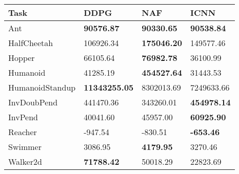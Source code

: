 \begin{tabular}[c]{@{}llll@{}}
Task & DDPG & NAF & ICNN \\ \hline
Ant & \textbf{90576.87} & \textbf{90330.65} & \textbf{90538.84} \\
HalfCheetah & 106926.34 & \textbf{175046.20} & 149577.46 \\
Hopper & 66105.64 & \textbf{76982.78} & 36100.99 \\
Humanoid & 41285.19 & \textbf{454527.64} & 31443.53 \\
HumanoidStandup & \textbf{11343255.05} & 8302013.69 & 7249633.66 \\
InvDoubPend & 441470.36 & 343260.01 & \textbf{454978.14} \\
InvPend & 40041.60 & 45957.00 & \textbf{60925.90} \\
Reacher & -947.54 & -830.51 & \textbf{-653.46} \\
Swimmer & 3086.95 & \textbf{4179.95} & 3270.46 \\
Walker2d & \textbf{71788.42} & 50018.29 & 22823.69 \\
\end{tabular}
